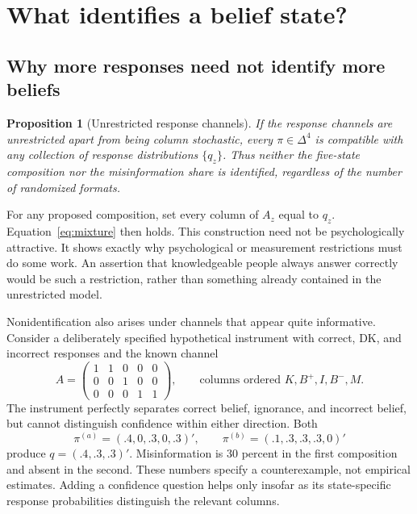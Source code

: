 \documentclass[11pt]{article}
\newtheorem{proposition}{Proposition}
\newcommand{\simplex}{\Delta^4}
\begin{document}
\section{What identifies a belief state?}

\subsection{Why more responses need not identify more beliefs}

\begin{proposition}[Unrestricted response channels]
\label{prop:nonid}
If the response channels are unrestricted apart from being column stochastic, every $\pi\in\simplex$ is compatible with any collection of response distributions $\{q_z\}$. Thus neither the five-state composition nor the misinformation share is identified, regardless of the number of randomized formats.
\end{proposition}

For any proposed composition, set every column of $A_z$ equal to $q_z$. Equation~\eqref{eq:mixture} then holds. This construction need not be psychologically attractive. It shows exactly why psychological or measurement restrictions must do some work. An assertion that knowledgeable people always answer correctly would be such a restriction, rather than something already contained in the unrestricted model.

Nonidentification also arises under channels that appear quite informative. Consider a deliberately specified hypothetical instrument with correct, DK, and incorrect responses and the known channel
\begin{equation}
 A=\begin{pmatrix}
 1&1&0&0&0\\
 0&0&1&0&0\\
 0&0&0&1&1
 \end{pmatrix},
 \qquad\text{columns ordered }K,B^+,I,B^-,M.
 \label{eq:toy}
\end{equation}
The instrument perfectly separates correct belief, ignorance, and incorrect belief, but cannot distinguish confidence within either direction. Both
\[
 \pi^{(a)}=(.4,0,.3,0,.3)',\qquad
 \pi^{(b)}=(.1,.3,.3,.3,0)'
\]
produce $q=(.4,.3,.3)'$. Misinformation is 30 percent in the first composition and absent in the second. These numbers specify a counterexample, not empirical estimates. Adding a confidence question helps only insofar as its state-specific response probabilities distinguish the relevant columns.
\end{document}
